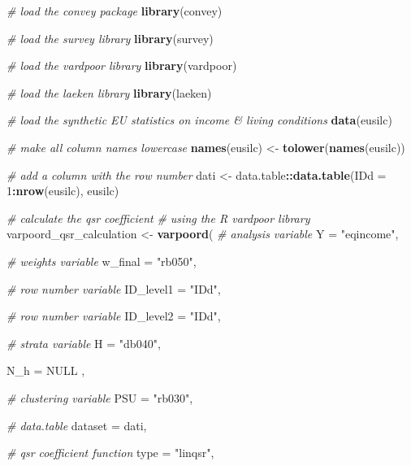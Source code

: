 \documentclass[
]{book}
\newenvironment{Shaded}{\begin{snugshade}}{\end{snugshade}}
\newcommand{\AttributeTok}[1]{\textcolor[rgb]{0.13,0.29,0.53}{#1}}
\newcommand{\CommentTok}[1]{\textcolor[rgb]{0.56,0.35,0.01}{\textit{#1}}}
\newcommand{\ConstantTok}[1]{\textcolor[rgb]{0.56,0.35,0.01}{#1}}
\newcommand{\DecValTok}[1]{\textcolor[rgb]{0.00,0.00,0.81}{#1}}
\newcommand{\FunctionTok}[1]{\textcolor[rgb]{0.13,0.29,0.53}{\textbf{#1}}}
\newcommand{\NormalTok}[1]{#1}
\newcommand{\OtherTok}[1]{\textcolor[rgb]{0.56,0.35,0.01}{#1}}
\newcommand{\SpecialCharTok}[1]{\textcolor[rgb]{0.81,0.36,0.00}{\textbf{#1}}}
\newcommand{\StringTok}[1]{\textcolor[rgb]{0.31,0.60,0.02}{#1}}
\begin{document}
\begin{Shaded}
\begin{Highlighting}[]
\CommentTok{\# load the convey package}
\FunctionTok{library}\NormalTok{(convey)}

\CommentTok{\# load the survey library}
\FunctionTok{library}\NormalTok{(survey)}

\CommentTok{\# load the vardpoor library}
\FunctionTok{library}\NormalTok{(vardpoor)}

\CommentTok{\# load the laeken library}
\FunctionTok{library}\NormalTok{(laeken)}

\CommentTok{\# load the synthetic EU statistics on income \& living conditions}
\FunctionTok{data}\NormalTok{(eusilc)}

\CommentTok{\# make all column names lowercase}
\FunctionTok{names}\NormalTok{(eusilc) }\OtherTok{\textless{}{-}} \FunctionTok{tolower}\NormalTok{(}\FunctionTok{names}\NormalTok{(eusilc))}

\CommentTok{\# add a column with the row number}
\NormalTok{dati }\OtherTok{\textless{}{-}}\NormalTok{ data.table}\SpecialCharTok{::}\FunctionTok{data.table}\NormalTok{(}\AttributeTok{IDd =} \DecValTok{1}\SpecialCharTok{:}\FunctionTok{nrow}\NormalTok{(eusilc), eusilc)}

\CommentTok{\# calculate the qsr coefficient}
\CommentTok{\# using the R vardpoor library}
\NormalTok{varpoord\_qsr\_calculation }\OtherTok{\textless{}{-}}
  \FunctionTok{varpoord}\NormalTok{(}
    \CommentTok{\# analysis variable}
    \AttributeTok{Y =} \StringTok{"eqincome"}\NormalTok{,}
    
    \CommentTok{\# weights variable}
    \AttributeTok{w\_final =} \StringTok{"rb050"}\NormalTok{,}
    
    \CommentTok{\# row number variable}
    \AttributeTok{ID\_level1 =} \StringTok{"IDd"}\NormalTok{,}
    
    \CommentTok{\# row number variable}
    \AttributeTok{ID\_level2 =} \StringTok{"IDd"}\NormalTok{,}
    
    \CommentTok{\# strata variable}
    \AttributeTok{H =} \StringTok{"db040"}\NormalTok{,}
    
    \AttributeTok{N\_h =} \ConstantTok{NULL}\NormalTok{ ,}
    
    \CommentTok{\# clustering variable}
    \AttributeTok{PSU =} \StringTok{"rb030"}\NormalTok{,}
    
    \CommentTok{\# data.table}
    \AttributeTok{dataset =}\NormalTok{ dati,}
    
    \CommentTok{\# qsr coefficient function}
    \AttributeTok{type =} \StringTok{"linqsr"}\NormalTok{,}
    

\end{Highlighting}
\end{Shaded}
\end{document}
